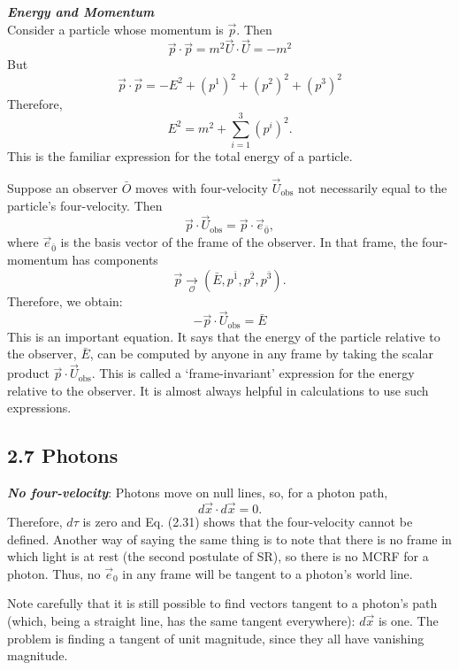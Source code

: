 \documentclass[12pt]{book}
\begin{document}
    \textit{\textbf{Energy and Momentum}}\\
        Consider a particle whose momentum is \( \vec{p} \). Then
        \[
        \vec{p} \cdot \vec{p} = m^2 \vec{U} \cdot \vec{U} = -m^2
        \]
        But
        \[
        \vec{p} \cdot \vec{p} = -E^2 + (p^1)^2 + (p^2)^2 + (p^3)^2
        \]
        Therefore,
        \[
        E^2 = m^2 + \sum_{i=1}^{3} (p^i)^2.
        \]
        This is the familiar expression for the total energy of a particle.
        
        Suppose an observer \( \bar{O} \) moves with four-velocity \( \vec{U}_{\text{obs}} \) not necessarily equal to the particle’s four-velocity. Then
        \[
        \vec{p} \cdot \vec{U}_{\text{obs}} = \vec{p} \cdot \vec{e}_{\bar{0}},
        \]
        where \( \vec{e}_{\bar{0}} \) is the basis vector of the frame of the observer. In that frame, the four-momentum has components
        \[
        \vec{p} \underset{\mathcal{O}}{\rightarrow} (\bar{E}, p^\bar{1}, p^\bar{2}, p^\bar{3}).
        \]
        Therefore, we obtain:
        \[
        - \vec{p} \cdot \vec{U}_{\text{obs}} = \bar{E}
        \]
        This is an important equation. It says that the energy of the particle relative to the observer, \( \bar{E} \), can be computed by anyone in any frame by taking the scalar product \( \vec{p} \cdot \vec{U}_{\text{obs}} \). This is called a ‘frame-invariant’ expression for the energy relative to the observer. It is almost always helpful in calculations to use such expressions.\\

    \subsection{2.7 Photons }

        \textit{\textbf{No four-velocity}}: Photons move on null lines, so, for a photon path,
        \[
        d\vec{x} \cdot d\vec{x} = 0.
        \]
        Therefore, \( d\tau \) is zero and Eq. (2.31) shows that the four-velocity cannot be defined. Another way of saying the same thing is to note that there is no frame in which light is at rest (the second postulate of SR), so there is no MCRF for a photon. Thus, no \( \vec{e}_0 \) in any frame will be tangent to a photon’s world line.
        
        Note carefully that it is still possible to find vectors tangent to a photon’s path (which, being a straight line, has the same tangent everywhere): \( d\vec{x} \) is one. The problem is finding a tangent of unit magnitude, since they all have vanishing magnitude.
\end{document}

